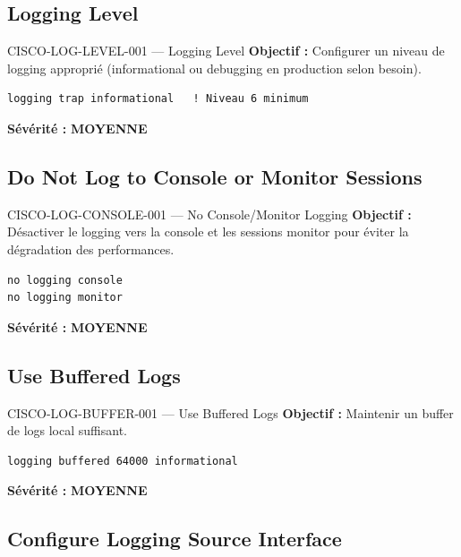 \documentclass[12pt, a4paper]{report}
\begin{document}
\subsection{Logging Level}

\begin{rulebox}{CISCO-LOG-LEVEL-001 — Logging Level}
  \textbf{Objectif :} Configurer un niveau de logging approprié (informational ou debugging en production selon besoin).

  \begin{lstlisting}
logging trap informational   ! Niveau 6 minimum
  \end{lstlisting}

  \textbf{Sévérité :} \textcolor{accentGreen}{\textbf{MOYENNE}}
\end{rulebox}

\subsection{Do Not Log to Console or Monitor Sessions}

\begin{rulebox}{CISCO-LOG-CONSOLE-001 — No Console/Monitor Logging}
  \textbf{Objectif :} Désactiver le logging vers la console et les sessions monitor pour éviter la dégradation des performances.

  \begin{lstlisting}
no logging console
no logging monitor
  \end{lstlisting}

  \textbf{Sévérité :} \textcolor{accentGreen}{\textbf{MOYENNE}}
\end{rulebox}

\subsection{Use Buffered Logs}

\begin{rulebox}{CISCO-LOG-BUFFER-001 — Use Buffered Logs}
  \textbf{Objectif :} Maintenir un buffer de logs local suffisant.

  \begin{lstlisting}
logging buffered 64000 informational
  \end{lstlisting}

  \textbf{Sévérité :} \textcolor{accentGreen}{\textbf{MOYENNE}}
\end{rulebox}

\subsection{Configure Logging Source Interface}
\end{document}
